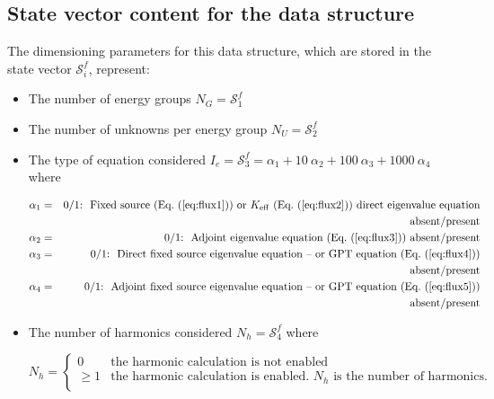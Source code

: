 \subsection{State vector content for the  data structure}\label{sect:fluxunkstate}

The dimensioning parameters for this data structure, which are stored in the state vector
$\mathcal{S}^{f}_{i}$, represent:

\begin{itemize}

\item The number of energy groups $N_{G}=\mathcal{S}^{f}_{1}$

\item The number of unknowns per energy group $N_{U}=\mathcal{S}^{f}_{2}$

\item The type of equation considered $ I_{e} = \mathcal{S}^{f}_{3} = \alpha_1 + 10 \ \alpha_2 + 100 \ \alpha_3 + 1000 \ \alpha_4 $ where
\vskip -0.45cm

\begin{eqnarray}
\nonumber \alpha_1 &=& 0/1\textrm{:} \ \ \textrm{Fixed source (\Eq{flux1}) or \keff{} (\Eq{flux2}) direct eigenvalue equation} \\
\nonumber &~&\textrm{absent/present} \\
\nonumber \alpha_2 &=& 0/1\textrm{:} \ \ \textrm{Adjoint eigenvalue equation (\Eq{flux3}) absent/present} \\
\nonumber \alpha_3 &=& 0/1\textrm{:} \ \ \textrm{Direct fixed source eigenvalue equation -- or GPT equation (\Eq{flux4})} \\
\nonumber &~&\textrm{absent/present} \\
\nonumber \alpha_4 &=& 0/1\textrm{:} \ \ \textrm{Adjoint fixed source eigenvalue equation -- or GPT equation (\Eq{flux5})} \\
\nonumber &~&\textrm{absent/present}
\end{eqnarray}

\item The number of harmonics considered $N_{h}=\mathcal{S}^{f}_{4}$ where

\begin{displaymath}
N_{h} = \left\{
\begin{array}{rl}
 0 & \textrm{the harmonic calculation is not enabled} \\
 \ge 1 & \textrm{the harmonic calculation is enabled. $N_{h}$ is the number of harmonics.} \\
\end{array} \right.
\end{displaymath}


\end{itemize}
